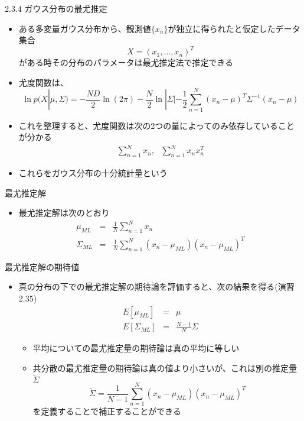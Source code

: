 \begin{frame}{2.3.4 ガウス分布の最尤推定}
 \begin{itemize}
  \item  ある多変量ガウス分布から、観測値$\{x_n\}$が独立に得られたと仮定したデータ集合
         \begin{equation}
          X=(x_1,...,x_n)^T
         \end{equation}
         がある時その分布のパラメータは最尤推定法で推定できる
  \item 尤度関数は、
        \begin{equation}
         \ln  p(X|\mu, \Sigma) = -\frac{ND}{2}\ln (2\pi)-\frac{N}{2}\ln |\Sigma|-\frac{1}{2}\sum_{n=1}^{N}(x_n-\mu)^T\Sigma^{-1}(x_n-\mu)
        \end{equation}
  \item これを整理すると、尤度関数は次の2つの量によってのみ依存していることが分かる
        \begin{eqnarray}
         \sum_{n=1}^{N}x_n, \ \ \  \sum_{n=1}^{N}x_nx_n^T
        \end{eqnarray}
  \item これらをガウス分布の\alert{十分統計量}という
 \end{itemize}
\end{frame}

\begin{frame}{最尤推定解}
 \begin{itemize}
  \item 最尤推定解は次のとおり
        \begin{eqnarray}
         \mu_{ML} &=& \frac{1}{N}\sum_{n=1}^{N}x_n\\
         \Sigma_{ML}&=&\frac{1}{N}\sum_{n=1}^{N}(x_n-\mu_{ML})(x_n-\mu_{ML})^T
        \end{eqnarray}
 \end{itemize}
\end{frame}

\begin{frame}{最尤推定解の期待値}
 \begin{itemize}
  \item 真の分布の下での最尤推定解の期待論を評価すると、次の結果を得る(演習2.35)
        \begin{eqnarray}
         E[\mu_{ML}]&=&\mu\\
         E[\Sigma_{ML}]&=&\frac{N-1}{N}\Sigma
        \end{eqnarray}
        \begin{itemize}
         \item 平均についての最尤推定量の期待論は真の平均に等しい
         \item 共分散の最尤推定量の期待論は真の値より小さいが、これは別の推定量$\widetilde{\Sigma}$
               \begin{equation}
                \widetilde{\Sigma} = \frac{1}{N-1}\sum_{n=1}^{N}(x_n-\mu_{ML})(x_n-\mu_{ML})^T
               \end{equation}
               を定義することで補正することができる
        \end{itemize}
 \end{itemize}
\end{frame}
